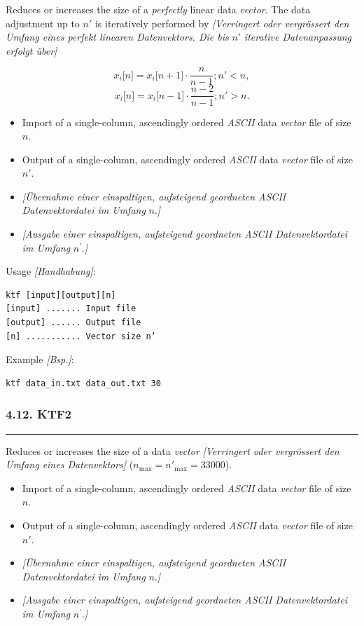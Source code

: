 \documentclass[
]{article}
\begin{document}
Reduces or increases the size of a \emph{perfectly} linear data
\emph{vector}. The data adjustment up to \(n'\) is iteratively performed
by \emph{{[}Verringert oder vergrössert den Umfang eines perfekt
linearen Datenvektors. Die bis} \(n'\) \emph{iterative Datenanpassung
erfolgt über{]}}

\[x_{i}\lbrack n\rbrack = x_{i}\lbrack n + 1\rbrack \cdot \frac{n}{n - 1};n' < n,\]
\[x_{i}\lbrack n\rbrack = x_{i}\lbrack n - 1\rbrack \cdot \frac{n - 2}{n - 1};n' > n.\]

\begin{itemize}
\item
  Import of a single-column, ascendingly ordered \emph{ASCII} data
  \emph{vector} file of size \(n\).
\item
  Output of a single-column, ascendingly ordered \emph{ASCII} data
  \emph{vector} file of size \(n'\).
\item
  \emph{{[}Übernahme einer einspaltigen, aufsteigend geordneten ASCII
  Datenvektordatei im Umfang} \(n.\)\emph{{]}}
\item
  \emph{{[}Ausgabe einer einspaltigen, aufsteigend geordneten ASCII
  Datenvektordatei im Umfang} \(n^{'}.\)\emph{{]}}
\end{itemize}

Usage \emph{{[}Handhabung{]}}:

\begin{verbatim}
ktf [input][output][n] 
[input] ....... Input file  
[output] ...... Output file 
[n] ........... Vector size n’
\end{verbatim}

Example \emph{{[}Bsp.{]}}:

\begin{verbatim}
ktf data_in.txt data_out.txt 30
\end{verbatim}

\hypertarget{ktf2}{%
\subsubsection{4.12. KTF2}\label{ktf2}}

\begin{center}\rule{0.5\linewidth}{0.5pt}\end{center}

Reduces or increases the size of a data \emph{vector}
\emph{{[}Verringert oder vergrössert den Umfang eines Datenvektors{]}}
(\(n_{\max} = n'_{\max} = 33000\)).

\begin{itemize}
\item
  Import of a single-column, ascendingly ordered \emph{ASCII} data
  \emph{vector} file of size \(n\).
\item
  Output of a single-column, ascendingly ordered \emph{ASCII} data
  \emph{vector} file of size \(n'\).
\item
  \emph{{[}Übernahme einer einspaltigen, aufsteigend geordneten ASCII
  Datenvektordatei im Umfang} \(n.\)\emph{{]}}
\item
  \emph{{[}Ausgabe einer einspaltigen, aufsteigend geordneten ASCII
  Datenvektordatei im Umfang} \(n^{'}.\)\emph{{]}}
\end{itemize}
\end{document}
